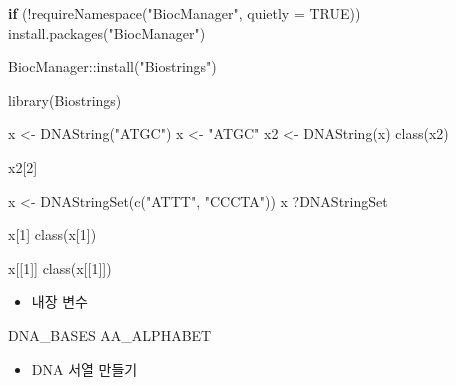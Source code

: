 \documentclass[
]{book}
\newenvironment{Shaded}{\begin{snugshade}}{\end{snugshade}}
\newcommand{\AttributeTok}[1]{\textcolor[rgb]{0.77,0.63,0.00}{#1}}
\newcommand{\ConstantTok}[1]{\textcolor[rgb]{0.00,0.00,0.00}{#1}}
\newcommand{\ControlFlowTok}[1]{\textcolor[rgb]{0.13,0.29,0.53}{\textbf{#1}}}
\newcommand{\DecValTok}[1]{\textcolor[rgb]{0.00,0.00,0.81}{#1}}
\newcommand{\FunctionTok}[1]{\textcolor[rgb]{0.00,0.00,0.00}{#1}}
\newcommand{\NormalTok}[1]{#1}
\newcommand{\OtherTok}[1]{\textcolor[rgb]{0.56,0.35,0.01}{#1}}
\newcommand{\SpecialCharTok}[1]{\textcolor[rgb]{0.00,0.00,0.00}{#1}}
\newcommand{\StringTok}[1]{\textcolor[rgb]{0.31,0.60,0.02}{#1}}
\providecommand{\tightlist}{%
  \setlength{\itemsep}{0pt}\setlength{\parskip}{0pt}}
\begin{document}
\begin{Shaded}
\begin{Highlighting}[]
\ControlFlowTok{if}\NormalTok{ (}\SpecialCharTok{!}\FunctionTok{requireNamespace}\NormalTok{(}\StringTok{"BiocManager"}\NormalTok{, }\AttributeTok{quietly =} \ConstantTok{TRUE}\NormalTok{))}
    \FunctionTok{install.packages}\NormalTok{(}\StringTok{"BiocManager"}\NormalTok{)}

\NormalTok{BiocManager}\SpecialCharTok{::}\FunctionTok{install}\NormalTok{(}\StringTok{"Biostrings"}\NormalTok{)}

\FunctionTok{library}\NormalTok{(Biostrings)}

\NormalTok{x }\OtherTok{\textless{}{-}} \FunctionTok{DNAString}\NormalTok{(}\StringTok{"ATGC"}\NormalTok{)}
\NormalTok{x }\OtherTok{\textless{}{-}} \StringTok{"ATGC"}
\NormalTok{x2 }\OtherTok{\textless{}{-}} \FunctionTok{DNAString}\NormalTok{(x)}
\FunctionTok{class}\NormalTok{(x2)}


\NormalTok{x2[}\DecValTok{2}\NormalTok{]}

\NormalTok{x }\OtherTok{\textless{}{-}} \FunctionTok{DNAStringSet}\NormalTok{(}\FunctionTok{c}\NormalTok{(}\StringTok{"ATTT"}\NormalTok{, }\StringTok{"CCCTA"}\NormalTok{))}
\NormalTok{x}
\NormalTok{?DNAStringSet}

\NormalTok{x[}\DecValTok{1}\NormalTok{]}
\FunctionTok{class}\NormalTok{(x[}\DecValTok{1}\NormalTok{])}

\NormalTok{x[[}\DecValTok{1}\NormalTok{]]}
\FunctionTok{class}\NormalTok{(x[[}\DecValTok{1}\NormalTok{]])}
\end{Highlighting}
\end{Shaded}

\begin{itemize}
\tightlist
\item
  내장 변수
\end{itemize}

\begin{Shaded}
\begin{Highlighting}[]
\NormalTok{DNA\_BASES}
\NormalTok{AA\_ALPHABET}
\end{Highlighting}
\end{Shaded}

\begin{itemize}
\tightlist
\item
  DNA 서열 만들기
\end{itemize}
\end{document}
